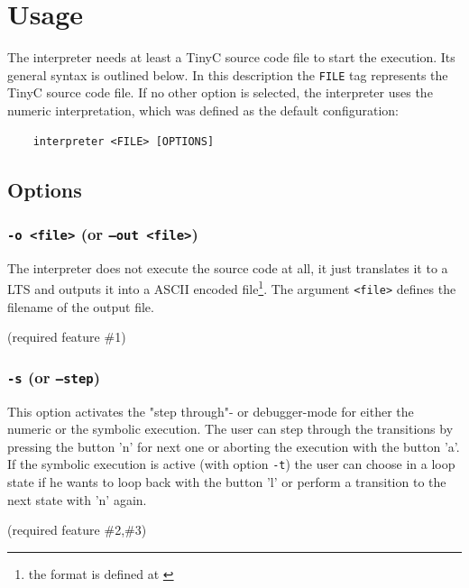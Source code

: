 \documentclass[english,a4paper,oneside]{article}%
\begin{document}
\newpage
\section{Usage}




The interpreter needs at least a TinyC source code file to start the execution. Its general syntax is outlined below. In this description the \texttt{FILE} tag represents the TinyC source code file. If no other option is selected, the interpreter uses the numeric interpretation, which was defined as the default configuration:
\begin{scriptsize}
\begin{lstlisting}
    interpreter <FILE> [OPTIONS]
\end{lstlisting}
\end{scriptsize}




\subsection{Options}

\subsubsection{\texttt{-o <file>} (or \texttt{--out <file>})}
		The interpreter does not execute the source code at all, it just translates it to a LTS and outputs it into a ASCII encoded file\footnote{the format is defined at \cite[p.~8]{cav}}. The argument \texttt{<file>} defines the filename of the output file.
		\begin{flushright}\footnotesize{(required feature \#1)}\end{flushright}

\subsubsection{\texttt{-s} (or \texttt{--step})}
		This option activates the "step through"- or debugger-mode for either the numeric or the symbolic execution. The user can step through the transitions by pressing the button 'n' for next one or aborting the execution with the button 'a'. If the symbolic execution is active (with option \texttt{-t}) the user can choose in a loop state if he wants to loop back with the button 'l' or perform a transition to the next state with 'n' again.
		\begin{flushright}\footnotesize{(required feature \#2,\#3)}\end{flushright}
\end{document}

